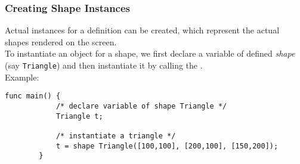     \subsubsection{Creating Shape Instances}
    Actual instances for a  definition can be created, which represent the actual shapes rendered on the screen.\\
    To instantiate an object for a shape, we first declare a variable of defined \textit{shape} (say \texttt{Triangle}) and then instantiate it by calling the .\\
    Example:\\
    \begin{lstlisting}[style=sol]
        func main() {
            /* declare variable of shape Triangle */
            Triangle t; 

            /* instantiate a triangle */
            t = shape Triangle([100,100], [200,100], [150,200]); 
        }
    \end{lstlisting}
